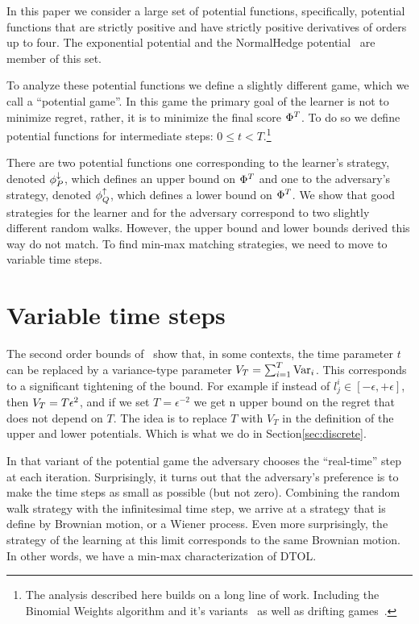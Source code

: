 \documentclass{article}[12pt]
\begin{document}
In this paper we consider a large set of potential functions,
specifically, potential functions that are strictly positive and have
strictly positive derivatives of orders up to four. The exponential
potential and the NormalHedge potential~\cite{chaudhuri2009parameter,luo2015achieving}
are member of this set. 

To analyze these potential functions we define a slightly different
game, which we call a ``potential game''. In this game the primary
goal of the learner is not to minimize regret, rather, it is to
minimize the final score $\Phi^T$. To do so
we define potential functions for intermediate steps: $0 \leq t
<T$.\footnote{The analysis described here builds on a long line of
  work. Including the Binomial Weights algorithm and it's
  variants~\cite{cesa1996line,abernethy2006continuous,abernethy2008optimal}
  as well as drifting games~\cite{schapire2001drifting,freund2002drifting}.}

There are two potential functions one corresponding to the
learner's strategy, denoted $\phi_{P}^{\downarrow}$, which defines an upper bound
on $\Phi^T$ and one to the adversary's strategy, denoted
$\phi_{Q}^{\uparrow}$, which defines a lower bound on $\Phi^T$. We show that
good strategies for the learner and for the adversary correspond to
two slightly different random walks. However, the upper bound and
lower bounds derived this way do not match. 
To find min-max matching strategies, we need to move to variable
time steps.

\section{Variable time steps}
The second order bounds of~\cite{cesa2007improved} show that, in some
contexts, the time parameter $t$ can be replaced by a variance-type
parameter $V_T= \sum_{i=1}^T \mbox{Var}_i$. This corresponds to a
significant tightening of the bound. For example if instead of $l_j^i
\in [-\epsilon,+\epsilon]$, then $V_T = T\epsilon^2$, and if we set
$T=\epsilon^{-2}$ we get n upper bound on the regret that does not
depend on $T$. The idea is to replace $T$ with $V_T$ in the definition
of the upper and lower potentials. Which is what we do in
Section\ref{sec:discrete}.

In that variant of the potential game the adversary chooses the
``real-time'' step at each iteration. Surprisingly, it turns out that
the adversary's preference is to make the time steps as small as
possible (but not zero). Combining the random walk strategy with the
infinitesimal time step, we arrive at a strategy that is define by
Brownian motion, or a Wiener process. Even more surprisingly, the
strategy of the learning at this limit corresponds to the same
Brownian motion. In other words, we have a min-max characterization of
DTOL.
\end{document}
